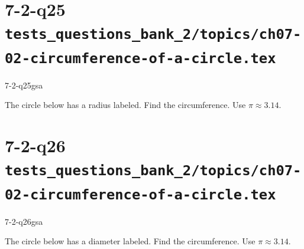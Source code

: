 \documentclass[12pt, fleqn, openany]{studyGuide}
\begin{document}
\newpage
\section*{7-2-q25 \hfill \normalsize\texttt{tests\_questions\_bank\_2/topics/ch07-02-circumference-of-a-circle.tex}}
\begin{practiceQuestion}{7-2-q25}{gsa}
\begin{questionText}
The circle below has a radius labeled. Find the circumference. Use $\pi \approx 3.14$.

\begin{center}
\end{center}
\end{questionText}
\end{practiceQuestion}

\newpage
\section*{7-2-q26 \hfill \normalsize\texttt{tests\_questions\_bank\_2/topics/ch07-02-circumference-of-a-circle.tex}}
\begin{practiceQuestion}{7-2-q26}{gsa}
\begin{questionText}
The circle below has a diameter labeled. Find the circumference. Use $\pi \approx 3.14$.

\begin{center}
\end{center}
\end{questionText}
\end{practiceQuestion}

\newpage
\end{document}
